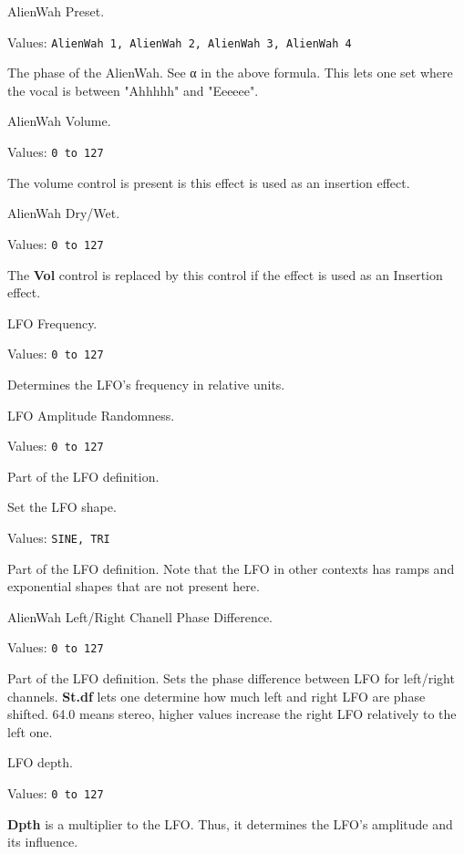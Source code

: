    AlienWah Preset.

   Values: \texttt{AlienWah 1, AlienWah 2, AlienWah 3, AlienWah 4}

   The phase of the AlienWah.
   See α in the above formula. This lets one set where the vocal is between
   "Ahhhhh" and "Eeeeee".

   AlienWah Volume.

   Values: \texttt{0 to 127}

   The volume control is present is this effect is used as an insertion
   effect.

   AlienWah Dry/Wet.

   Values: \texttt{0 to 127}

   The \textbf{Vol} control is replaced by this control if the effect is
   used as an Insertion effect.

   LFO Frequency.

   Values: \texttt{0 to 127}

   Determines the LFO’s frequency in relative units.

   LFO Amplitude Randomness.

   Values: \texttt{0 to 127}

   Part of the LFO definition.

   Set the LFO shape.

   Values: \texttt{SINE, TRI}

   Part of the LFO definition.
   Note that the LFO in other contexts has ramps and exponential shapes that
   are not present here.

   AlienWah Left/Right Chanell Phase Difference.

   Values: \texttt{0 to 127}

   Part of the LFO definition.
   Sets the phase difference between LFO for left/right channels.
   \textbf{St.df} lets one determine how much left and right LFO are phase
   shifted.  64.0 means stereo, higher values increase the right LFO
   relatively to the left one.

   LFO depth.

   Values: \texttt{0 to 127}

   \textbf{Dpth} is a multiplier to the LFO. Thus, it determines
   the LFO's amplitude and its influence.

